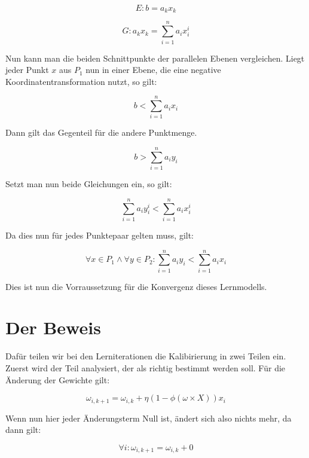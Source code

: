 \documentclass[11pt]{article} %
\begin{document}
\begin{equation}
E: b = a_{k} x_{k}  
\end{equation}

\begin{equation}
G : a_{k} x_{k} = \sum^{n}_{i=1} a_{i} x_{i}^{i}
\end{equation}

Nun kann man die beiden Schnittpunkte der parallelen Ebenen vergleichen. Liegt jeder Punkt $x$ aus $P_{1}$ nun in einer Ebene, die eine 
negative Koordinatentransformation nutzt, so gilt:

\begin{equation}
b < \sum^{n}_{i=1} a_{i} x_{i}
\end{equation}

Dann gilt das Gegenteil für die andere Punktmenge.

\begin{equation}
b > \sum^{n}_{i=1} a_{i} y_{i}
\end{equation}

Setzt man nun beide Gleichungen ein, so gilt:

\begin{equation}
\sum^{n}_{i=1} a_{i} y_{i}^{i} < \sum^{n}_{i=1} a_{i} x_{i}^{i}
\end{equation}

Da dies nun für jedes Punktepaar gelten muss, gilt:

\begin{equation}
\forall x \in P_{1} \wedge \forall y \in P_{2} :  \sum^{n}_{i=1} a_{i} y_{i} < \sum^{n}_{i=1} a_{i} x_{i}
\end{equation}

Dies ist nun die Vorraussetzung für die Konvergenz dieses Lernmodells.

\section{Der Beweis}
Dafür teilen wir bei den Lerniterationen die Kalibirierung in zwei Teilen ein. Zuerst wird der Teil analysiert, der als richtig bestimmt werden soll. Für die Änderung der Gewichte gilt:

\begin{equation}
\omega_{i, k+1} = \omega_{i, k} + \eta(1 - \phi{(\omega \times X)})x_{i}
\end{equation}

Wenn nun hier jeder Änderungsterm Null ist, ändert sich also nichts mehr, da dann gilt:

\begin{equation}
\forall i:  \omega_{i, k+1} = \omega_{i, k} + 0
\end{equation}
\end{document}
